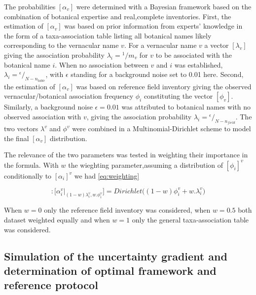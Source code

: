 \documentclass[fleqn,10pt]{ArtEcoFoG} %
\begin{document}
The probabilities \([\alpha_v]\) were determined with a Bayesian
framework based on the combination of botanical expertise and
real,complete inventories. First, the estimation of \([\alpha_v]\) was
based on prior information from experts' knowledge in the form of a
taxa-association table listing all botanical names likely corresponding
to the vernacular name \(v\). For a vernacular name \(v\) a vector
\([\lambda_v]\) giving the association probability
\(\lambda_i={}^1/m_v\) for \(v\) to be associated with the botanical
name \(i\). When no association between \(v\) and \(i\) was established,
\(\lambda_i={}^\epsilon\big/_{N-n_{table}}\), with \(\epsilon\) standing
for a background noise set to 0.01 here. Second, the estimation of
\([\alpha_v]\) was based on reference field inventory giving the
observed vernacular/botanical association frequency \(\phi_i\)
constituting the vector \([\phi_v]\). Similarly, a background noise
\(\epsilon=0.01\) was attributed to botanical names with no observed
association with \(v\), giving the association probability
\(\lambda_i={}^\epsilon\big/_{N-n_{field}}\). The two vectors
\(\lambda^v\) and \(\phi^v\) were combined in a Multinomial-Dirichlet
scheme \citep{McCarthy2007} to model the final \([\alpha_v]\)
distribution.

The relevance of the two parameters was tested in weighting their
importance in the formula. With \(w\) the wieghting parameter,assuming a
distribution of \([\phi_i]^v\) conditionally to \([\alpha_i]^v\) we had
\eqref{eq:weighting}

\begin{equation}
[\alpha_i^v]: 
\Big[\alpha_i^v | _{(1-w)\lambda_i^v ,w.\phi_i^v}\Big] =Dirichlet\Big((1-w)\phi_i^v+w.\lambda_i^v\Big)
\label{eq:weighting}
\end{equation}

When \(w=0\) only the reference field inventory was considered, when
\(w=0.5\) both dataset weighted equally and when \(w=1\) only the
general taxa-association table was considered.

\subsection{Simulation of the uncertainty gradient and determination of
optimal framework and reference
protocol}\label{simulation-of-the-uncertainty-gradient-and-determination-of-optimal-framework-and-reference-protocol}
\end{document}
